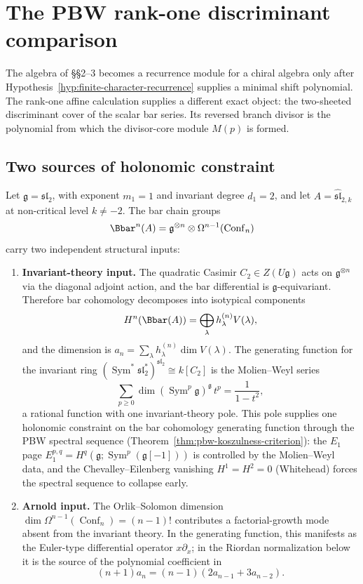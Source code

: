 \section{The PBW rank-one discriminant comparison}

The algebra of \S\S2--3 becomes a recurrence module for a chiral algebra
only after Hypothesis~\ref{hyp:finite-character-recurrence} supplies a
minimal shift polynomial.
The rank-one affine calculation supplies a different exact object:
the two-sheeted discriminant cover of the scalar bar series.
Its reversed branch divisor is the polynomial from which the divisor-core module
\(M(p)\) is formed.

\subsection{Two sources of holonomic constraint}

Let \(\mathfrak g=\mathfrak{sl}_2\), with exponent \(m_1=1\) and invariant
degree \(d_1=2\), and let \(A=\widehat{\mathfrak{sl}}_{2,k}\) at
non-critical level \(k\ne -2\).
The bar chain groups
\[
\Bbar^n(A)=\mathfrak g^{\otimes n}\otimes
\Omega^{n-1}(\operatorname{Conf}_n)
\]
carry two independent structural inputs:

\begin{enumerate}[label=\textup{(\Roman*)}]
\item \textbf{Invariant-theory input.}
The quadratic Casimir \(C_2\in Z(U\mathfrak g)\) acts on
\(\mathfrak g^{\otimes n}\) via the diagonal adjoint action,
and the bar differential is \(\mathfrak g\)-equivariant.
Therefore bar cohomology decomposes into isotypical components
\[
H^n(\Bbar(A))=\bigoplus_\lambda h_\lambda^{(n)}V(\lambda),
\]
and the dimension is
\(a_n=\sum_\lambda h_\lambda^{(n)}\dim V(\lambda)\).
The generating function for the invariant ring
\((\operatorname{Sym}^*\mathfrak{sl}_2^*)^{\mathfrak{sl}_2}\cong
k[C_2]\) is the Molien--Weyl series
\begin{equation}\label{eq:molien-weyl-g}
\sum_{p\ge 0}\dim(\operatorname{Sym}^p\mathfrak g)^{\mathfrak g}
\,t^p
=\frac{1}{1-t^2},
\end{equation}
a rational function with one invariant-theory pole.
This pole supplies one holonomic constraint on the bar cohomology
generating function through the PBW spectral sequence
(Theorem~\ref{thm:pbw-koszulness-criterion}):
the \(E_1\) page
\(E_1^{p,q}=H^q(\mathfrak g;\operatorname{Sym}^p
(\mathfrak g[-1]))\)
is controlled by the Molien--Weyl data, and the
Chevalley--Eilenberg vanishing \(H^1=H^2=0\) (Whitehead)
forces the spectral sequence to collapse early.

\item \textbf{Arnold input.}
The Orlik--Solomon dimension
\(\dim\Omega^{n-1}(\operatorname{Conf}_n)=(n-1)!\)
contributes a factorial-growth mode absent from the invariant
theory.
In the generating function, this manifests as the Euler-type
differential operator \(x\partial_x\); in the Riordan normalization below
it is the source of the polynomial coefficient in
\[
(n{+}1)a_n=(n{-}1)(2a_{n-1}+3a_{n-2}).
\]
\end{enumerate}

